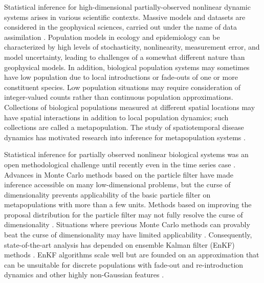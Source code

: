 \documentclass[12pt]{article}\usepackage[]{graphicx}\usepackage[]{xcolor}
\begin{document}
Statistical inference for high-dimensional partially-observed nonlinear dynamic systems arises in various scientific contexts.
Massive models and datasets are considered in the geophysical sciences, carried out under the name of data assimilation \citep{evensen09book}.
Population models in ecology and epidemiology can be characterized by high levels of stochasticity, nonlinearity, measurement error, and model uncertainty, leading to challenges of a somewhat different nature than geophysical models.
In addition, biological population systems may sometimes have low population due to local introductions or fade-outs of one or more constituent species.
Low population situations may require consideration of integer-valued counts rather than continuous population approximations.
Collections of biological populations measured at different spatial locations may have spatial interactions in addition to local population dynamics; such collections are called a metapopulation.
The study of spatiotemporal disease dynamics has motivated research into inference for metapopulation systems \citep{xia04,li20,park20,ionides21,cauchemez08,bjornstad19}.

Statistical inference for partially observed nonlinear biological systems was an open methodological challenge until recently even in the time series case \citep{bjornstad01}.
Advances in Monte Carlo methods based on the particle filter have made inference accessible on many low-dimensional problems, but the curse of dimensionality \citep{bengtsson08} prevents applicability of the basic particle filter on metapopulations with more than a few units.
Methods based on improving the proposal distribution for the particle filter may not fully resolve the curse of dimensionality \citep{snyder15}.
Situations where previous Monte Carlo methods can provably beat the curse of dimensionality may have limited applicability \citep{beskos17,park20,ionides21}.
Consequently, state-of-the-art analysis has depended on ensemble Kalman filter (EnKF) methods \citep{li20}.
EnKF algorithms scale well but are founded on an approximation that can be unsuitable for discrete populations with fade-out and re-introduction dynamics and other highly non-Gaussian features \citep{ionides21}.
\end{document}
